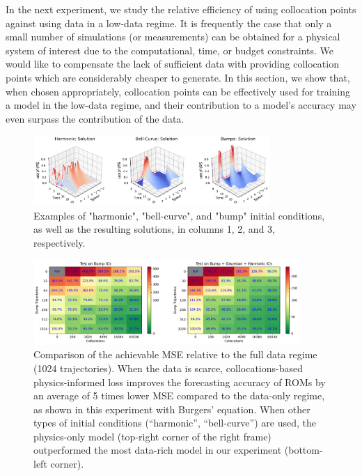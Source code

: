 In the next experiment, we study the relative efficiency of using collocation points against using data in a low-data regime. It is frequently the case that only a small number of simulations (or measurements) can be obtained for a physical system of interest due to the computational, time, or budget constraints. We would like to compensate the lack of sufficient data with providing collocation points which are considerably cheaper to generate. In this section, we show that, when chosen appropriately, collocation points can be effectively used for training a model in the low-data regime, and their contribution to a model's accuracy may even surpass the contribution of the data. 
\begin{figure}[ht]
    \centering
    \includegraphics[width=0.8\textwidth]{figures/burgers_examples_of_ics.pdf}
    \caption{Examples of "harmonic", "bell-curve", and "bump" initial conditions, as well as the resulting solutions, in columns 1, 2, and 3, respectively.}
    \label{fig:burgers_examples_of_ics}
\end{figure}
\begin{figure}[ht]
    \centering
    \includegraphics[width=0.9\textwidth]{figures/data_vs_collocations.pdf}
    \caption{Comparison of the achievable MSE relative to the full data regime (1024 trajectories). When the data is scarce, collocations-based physics-informed loss improves the forecasting accuracy of ROMs by an average of 5 times lower MSE compared to the data-only regime, as shown in this experiment with Burgers' equation. When other types of initial conditions (``harmonic'', ``bell-curve'') are used, the physics-only model (top-right corner of the right frame) outperformed the most data-rich model in our experiment (bottom-left corner). }
    \label{fig:burger_data_vs_collocations}
\end{figure}

